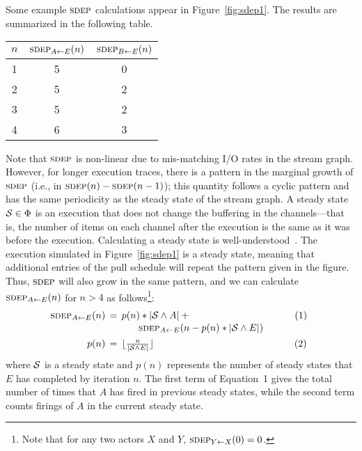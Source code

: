 \documentclass{sig-alternate}
\begin{document}
Some example $\textsc{sdep}$ calculations appear in Figure~\ref{fig:sdep1}.
The results are summarized in the following table.
\begin{center}
{\small
\begin{tabular}{|c|c|c|}
\hline
$n$ & $\sdepf{A}{E}(n)$ & $\sdepf{B}{E}(n)$ \\
\hline \hline
1 & 5 & 0 \\ \hline
2 & 5 & 2 \\ \hline
3 & 5 & 2 \\ \hline
4 & 6 & 3 \\ \hline
\end{tabular}}
\end{center}
Note that $\textsc{sdep}$ is non-linear due to mis-matching I/O rates in the
stream graph.  However, for longer execution traces, there is a
pattern in the marginal growth of $\textsc{sdep}$ (i.e., in $\textsc{sdep}(n) -
\textsc{sdep}(n-1)$); this quantity follows a cyclic pattern and has the same
periodicity as the steady state of the stream graph.  A steady state
${\cal S} \in \Phi$ is an execution that does not change the buffering
in the channels---that is, the number of items on each channel after
the execution is the same as it was before the execution.  Calculating
a steady state is well-understood~\cite{LM87-i}.  The execution
simulated in Figure~\ref{fig:sdep1} is a steady state, meaning that
additional entries of the pull schedule will repeat the pattern given
in the figure.  Thus, $\textsc{sdep}$ will also grow in the same pattern, and
we can calculate $\sdepf{A}{E}(n)$ for $n > 4$ as
follows\footnote{\small Note that for any two actors $X$ and $Y$,
$\sdepf{Y}{X}(0) = 0$.}:
\begin{equation}
\label{eq:sdep-steady}
\nonumber
\hspace{-4.5pt}\begin{array}{rcl}
\sdepf{A}{E}(n) \hspace{-5.5pt}&=&\hspace{-5.5pt} p(n) * |{\cal S} \wedge A| + ~~~~~~~~~~~~~~~~~~~~~~~~~~~~~\hspace{3.3pt}~~(1)\\[0.2Ex]
~&~&\mbox{~}\hspace{8.5pt} \sdepf{A}{E}(n - p(n) * |{\cal S} \wedge E|) \\[1Ex]
p(n) \hspace{-5.5pt}&=&\hspace{-5.5pt} \lfloor \frac{n}{|{\cal S} \wedge E|} \rfloor~~~~~~~~~~~~~~~~~~~~~~~~~~~~~~~~~~\hspace{1.3pt}~~~~~~~~~(2) %
\end{array}
\end{equation}
where ${\cal S}$ is a steady state and $p(n)$ represents the number of
steady states that $E$ has completed by iteration $n$.  The first term
of Equation~1 gives the total number of times that $A$ has fired in
previous steady states, while the second term counts firings of $A$ in
the current steady state.
\end{document}
